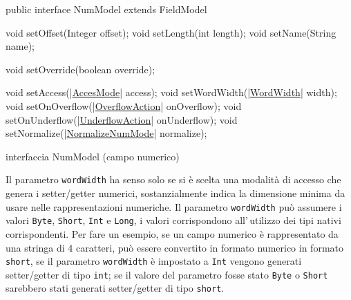 \documentclass[a4paper,10pt]{report}
\newif\ifesource
\newenvironment{elisting}[1][H]
  {\captionsetup{aboveskip=0pt}\begin{listing}[#1]}
  {\end{listing}%
}
\begin{document}
\ifesource
\begin{figure*}[!htb]
\begin{lstlisting}[language=java, 
caption=interfaccia NumModel (campo numerico), 
label=lst:NumModel]
public interface NumModel extends FieldModel {
    void setOffset(Integer offset);
    void setLength(int length);
    void setName(String name);

    void setOverride(boolean override);

    void setAccess((*\hyperref[lst:AccesMode]{AccesMode}*) access);
    void setWordWidth((*\hyperref[lst:WordWidth]{WordWidth}*) width);
    void setOnOverflow((*\hyperref[lst:OverflowAction]{OverflowAction}*) onOverflow);
    void setOnUnderflow((*\hyperref[lst:UnderflowAction]{UnderflowAction}*) onUnderflow);
    void setNormalize((*\hyperref[lst:NormalizeNumMode]{NormalizeNumMode}*) normalize);
}
\end{lstlisting}\index{NumModel}
\end{figure*}
\else
\begin{elisting}[!htb]
\begin{javacode}
public interface NumModel extends FieldModel {
    void setOffset(Integer offset);
    void setLength(int length);
    void setName(String name);

    void setOverride(boolean override);

    void setAccess(|\hyperref[lst:AccesMode]{AccesMode}| access);
    void setWordWidth(|\hyperref[lst:WordWidth]{WordWidth}| width);
    void setOnOverflow(|\hyperref[lst:OverflowAction]{OverflowAction}| onOverflow);
    void setOnUnderflow(|\hyperref[lst:UnderflowAction]{UnderflowAction}| onUnderflow);
    void setNormalize(|\hyperref[lst:NormalizeNumMode]{NormalizeNumMode}| normalize);
}
\end{javacode}
\caption{interfaccia NumModel (campo numerico)}
\label{lst:NumModel}
\end{elisting}
\fi

Il parametro \verb!wordWidth! ha senso solo se si è scelta una modalità di
accesso che genera i setter/getter numerici, sostanzialmente indica la 
dimensione minima da usare nelle rappresentazioni numeriche.
Il parametro \verb!wordWidth! può assumere i valori \verb!Byte!, \verb!Short!, 
\verb!Int! e \verb!Long!, i valori corrispondono all'\,utilizzo dei tipi nativi
corrispondenti.
Per fare un esempio, se un campo numerico è rappresentato da una stringa di 4 
caratteri, può essere convertito in formato numerico in formato \verb!short!,
se il parametro \verb!wordWidth! è impostato a \verb!Int! vengono generati
setter/getter di tipo \verb!int!; se il valore del parametro fosse stato 
\verb!Byte! o  \verb!Short! sarebbero stati generati setter/getter di tipo 
\verb!short!.
\end{document}
